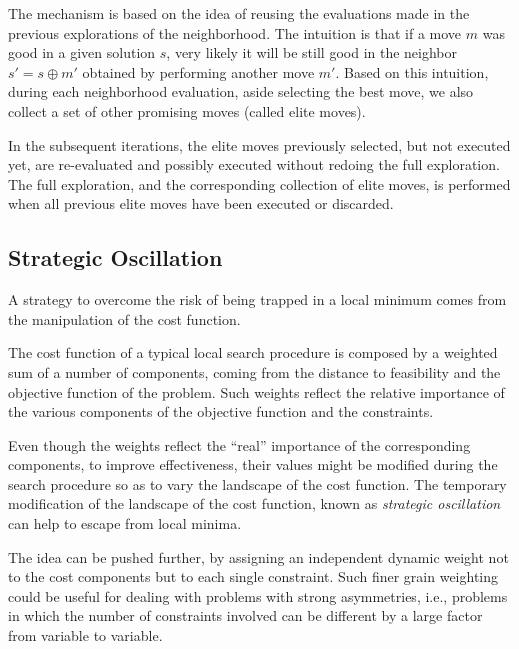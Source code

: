 The mechanism is based on the idea of reusing the evaluations made in the
previous explorations of the neighborhood. The intuition is that if a move $m$
was good in a given solution $s$, very likely it will be still good in the neighbor 
$s' = s \oplus m'$ obtained by performing another move
$m'$.  Based on this intuition, during each neighborhood evaluation, aside selecting the best move, 
we also collect a set of other promising moves (called elite moves). 

In the subsequent iterations, the elite moves previously selected, but
not executed yet, are re-evaluated and possibly executed without
redoing the full exploration. The full exploration, and the
corresponding collection of elite moves, is performed when all
previous elite moves have been executed or discarded.



\subsection{Strategic Oscillation}
\label{sec:strategic-oscillation}

A strategy to overcome the risk of being trapped in a local minimum comes from the manipulation of the cost function.

The cost function of a typical local search procedure is composed by a weighted sum of a
number of components, coming from the distance to feasibility and the objective function
of the problem.  Such weights reflect the relative importance of the
various components of the objective function and the constraints.  

Even though the weights reflect the ``real'' importance of the corresponding
components, to improve effectiveness, their values might be modified during
the search procedure so as to vary the landscape of the cost function. The
temporary modification of the landscape of the cost function, known as \emph{strategic oscillation} 
can help to escape from local minima. 

The idea can be pushed further, by assigning an independent dynamic
weight not to the cost components but to each single constraint.  Such
finer grain weighting could be useful for dealing with problems with
strong asymmetries, i.e., problems in which the number of constraints
involved can be different by a large factor from variable to variable.


